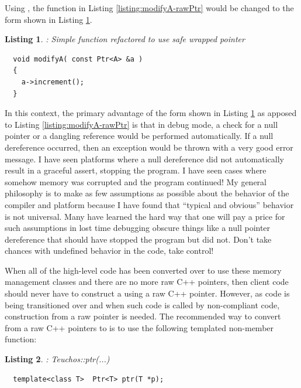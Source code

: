 \documentclass[pdf,ps2pdf,11pt]{SANDreport}
\newtheorem{listing}{Listing}
\begin{document}
Using {}, the function {} in Listing
{}\ref{listing:modifyA-rawPtr} would be changed to the form shown in
Listing {}\ref{listing:modifyA-Ptr}.

{}\begin{listing}: Simple function refactored to use safe {} wrapped
pointer
\label{listing:modifyA-Ptr}
{\small\begin{verbatim}
  void modifyA( const Ptr<A> &a )
  {
    a->increment();
  }
\end{verbatim}}
\end{listing}

In this context, the primary advantage of the form shown in Listing
{}\ref{listing:modifyA-Ptr} as apposed to Listing
{}\ref{listing:modifyA-rawPtr} is that in debug mode, a check for a null
pointer or a dangling reference would be performed automatically.  If a null
dereference occurred, then an exception would be thrown with a very good error
message.  I have seen platforms where a null dereference did not automatically
result in a graceful assert, stopping the program.  I have seen cases where
somehow memory was corrupted and the program continued!  My general philosophy
is to make as few assumptions as possible about the behavior of the compiler
and platform because I have found that ``typical and obvious'' behavior is not
universal.  Many have learned the hard way that one will pay a price for such
assumptions in lost time debugging obscure things like a null pointer
dereference that should have stopped the program but did not.  Don't take
chances with undefined behavior in the code, take control!

When all of the high-level code has been converted over to use these
memory management classes and there are no more raw C++ pointers, then
client code should never have to construct a {} using a
raw C++ pointer.  However, as code is being transitioned over and
when such code is called by non-compliant code, construction from a
raw pointer is needed.  The recommended way to convert from a raw C++
pointers to {} is to use the following templated
non-member function:

\begin{listing}: Teuchos::ptr(...)\\
\label{listing:ptr}
{\small\begin{verbatim}
  template<class T>  Ptr<T> ptr(T *p);
\end{verbatim}}
\end{listing}
\end{document}
